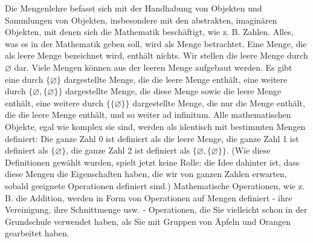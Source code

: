 Die Mengenlehre befasst sich mit der Handhabung von Objekten und Sammlungen von Objekten, insbesondere mit den abstrakten, imaginären Objekten, mit denen sich die Mathematik beschäftigt, wie z. B. Zahlen. Alles, was es in der Mathematik geben soll, wird als Menge betrachtet.  Eine Menge, die als leere Menge bezeichnet wird, enthält nichts.  Wir stellen die leere Menge durch $\varnothing$ dar.  Viele Mengen können aus der leeren Menge aufgebaut werden.  Es gibt eine durch $\{\varnothing\}$ dargestellte Menge, die die leere Menge enthält, eine weitere durch $\{\varnothing,\{\varnothing\}\}$ dargestellte Menge, die diese Menge sowie die leere Menge enthält, eine weitere durch $\{\{\varnothing\}\}$ dargestellte Menge, die nur die Menge enthält, die die leere Menge enthält, und so weiter ad infinitum. Alle mathematischen Objekte, egal wie komplex sie sind, werden als identisch mit bestimmten Mengen definiert: Die ganze Zahl 0 ist definiert als die leere Menge, die ganze Zahl 1 ist definiert als $\{\varnothing\}$, die ganze Zahl 2 ist definiert als $\{\varnothing,\{\varnothing\}\}$.  (Wie diese Definitionen gewählt wurden, spielt jetzt keine Rolle: die Idee dahinter ist, dass diese Mengen die Eigenschaften haben, die wir von ganzen Zahlen erwarten, sobald geeignete Operationen definiert sind.)  Mathematische Operationen, wie z. B. die Addition, werden in Form von Operationen auf Mengen definiert - ihre Vereinigung, ihre Schnittmenge usw. - Operationen, die Sie vielleicht schon in der Grundschule verwendet haben, als Sie mit Gruppen von Äpfeln und Orangen gearbeitet haben.

